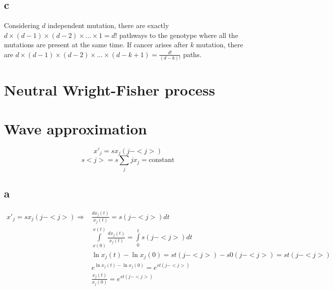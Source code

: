 \subsection{c}

Considering $d$ independent mutation, there are exactly $d\times(d-1)\times(d-2)\times\dots\times1 = d!$ pathways to the genotype where all the mutations are present at the same time. If cancer arises after $k$ mutation, there are $d\times(d-1)\times(d-2)\times\dots\times(d-k+1) = \frac{d!}{(d-k)!}$ paths.

\setcounter{chapter}{5}
\setcounter{section}{0}
\section{Neutral Wright-Fisher process}

\setcounter{chapter}{6}
\setcounter{section}{0}
\section{Wave approximation}
\[ x'_j = sx_j (j-<j>)  \]
\[ s<j> = s\sum\limits_{j}jx_j = \text{constant} \]

\subsection{a}

\begin{align*}
 x'_j = sx_j(j-<j>)	\Rightarrow & \frac{dx_j(t)}{x_j(t)} = s(j-<j>)dt\\
& \int\limits_{x(0)}^{x(t)} \frac{dx_j(t)}{x_j(t)} = \int\limits_{0}^{t} s(j-<j>)dt\\
& \ln x_j(t) - \ln x_j(0) = st(j-<j>) -s0(j-<j>) = st(j-<j>)\\
& e^{\ln x_j(t)- \ln x_j(0)} = e^{st(j-<j>)}\\
& \frac{x_j(t)}{x_j(0)} = e^{st(j-<j>)}
\end{align*}


